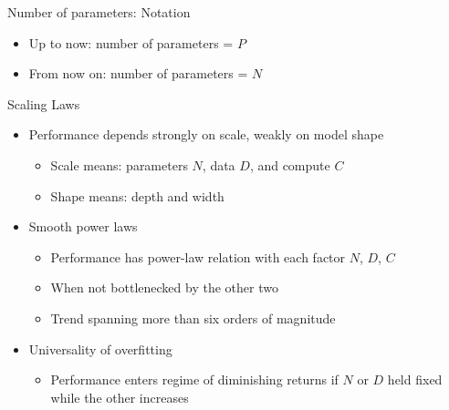 
\begin{vbframe}{Number of parameters: Notation}

\vfill

\begin{itemize}

	\item Up to now: number of parameters = $P$
	\item From now on: number of parameters = $N$


\end{itemize}

\vfill

\end{vbframe}



\begin{vbframe}{Scaling Laws}
\href{https://arxiv.org/abs/2001.08361}{} 

\vfill

\begin{itemize}

	\item Performance depends strongly on scale, weakly
	on model shape \qmark
	\begin{itemize}
	\item Scale means: parameters $N$, data $D$, and compute $C$
	\item Shape means: depth and width
	\end{itemize}

	\item Smooth power laws \qmark
	\begin{itemize}
	\item Performance has power-law relation with each factor $N$, $D$, $C$
	\item When not bottlenecked by the other two 
	\item Trend spanning more than six orders of magnitude
	\end{itemize}

	\item Universality of overfitting \qmark 
	\begin{itemize}
	\item Performance enters regime of diminishing returns if $N$ or $D$ held fixed while the other increases
	\end{itemize}

\end{itemize}

\vfill

\end{vbframe}

